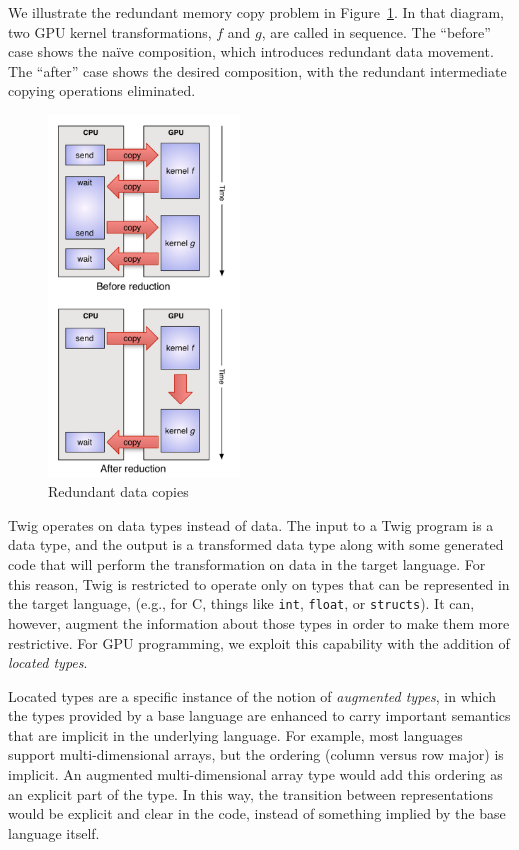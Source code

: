 We illustrate the redundant memory copy problem in Figure~\ref{basic-idea}. In that diagram, two GPU kernel transformations, $f$ and $g$, are called in sequence. The ``before'' case shows the na\"ive composition, which introduces redundant data movement. The ``after'' case shows the desired composition, with the redundant intermediate copying operations eliminated.

\begin{figure}[ht]
\begin{center}
\includegraphics[width=2in]{images/basic-idea}
\end{center}
\caption{Redundant data copies}
\label{basic-idea}
\end{figure}

Twig operates on data types instead of data. The input to a Twig program is a data type, and the output is a transformed data type along with some generated code that will perform the transformation on data in the target language. For this reason, Twig is restricted to operate only on types that can be represented in the target language, (e.g., for C, things like \texttt{int}, \texttt{float}, or \texttt{structs}). It can, however, augment the information about those types in order to make them more restrictive. For GPU programming, we exploit this capability with the addition of \emph{located types}.

Located types are a specific instance of the notion of \emph{augmented types}, in which the types provided by a base language are enhanced to carry important semantics that are implicit in the underlying language. For example, most languages support multi-dimensional arrays, but the ordering (column versus row major) is implicit. An augmented multi-dimensional array type would add this ordering as an explicit part of the type. In this way, the transition between representations would be explicit and clear in the code, instead of something implied by the base language itself.

